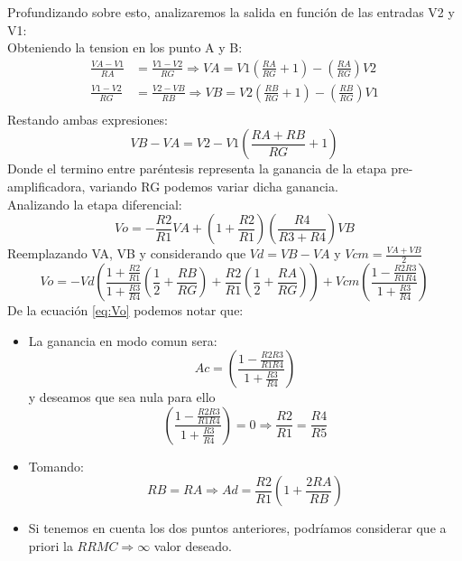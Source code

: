 Profundizando sobre esto, analizaremos la salida en función de las entradas V2 y V1:
\\Obteniendo la tension en los punto A y B:
\begin{equation*}
    \begin{split}
        \frac{VA-V1}{RA} &= \frac{V1-V2}{RG} \Rightarrow
        VA = V1 \left(\frac{RA}{RG} + 1\right) - \left(\frac{RA}{RG}\right)V2\\
        \frac{V1-V2}{RG} &= \frac{V2-VB}{RB} \Rightarrow
        VB = V2 \left(\frac{RB}{RG} + 1\right) - \left(\frac{RB}{RG}\right)V1\\
    \end{split}
\end{equation*}
Restando ambas expresiones:
\begin{equation*}
    VB-VA = V2 -V1 \left(\frac{RA+RB}{RG} + 1 \right)
\end{equation*}
Donde el termino entre paréntesis representa la ganancia de la etapa pre-amplificadora, variando RG podemos variar dicha ganancia.
\\Analizando la etapa diferencial:
\begin{equation*}
    V o=-\frac{R 2}{R 1} V A+\left(1+\frac{R 2}{R 1}\right)\left(\frac{R 4}{R 3+R 4}\right) V B
\end{equation*}
Reemplazando VA, VB y considerando que $Vd=VB-VA$ y $Vcm=\frac{VA+VB}{2}$
\begin{equation}\label{eq:Vo}
    V o=-V d\left(\frac{1+\frac{R 2}{R 1}}{1+\frac{R 3}{R 4}}\left(\frac{1}{2}+\frac{R B}{R G}\right)+\frac{R 2}{R 1}\left(\frac{1}{2}+\frac{R A}{R G}\right)\right)+V c m\left(\frac{1-\frac{R 2 R 3}{R 1 R 4}}{1+\frac{R 3}{R 4}}\right)
\end{equation}
De la ecuación \autoref{eq:Vo} podemos notar que:
\begin{itemize}
    \item La ganancia en modo comun sera: 
    \begin{equation*}
        Ac = \left(\frac{1-\frac{R 2 R 3}{R 1 R 4}}{1+\frac{R 3}{R 4}}\right)
    \end{equation*}
    y deseamos que sea nula para ello \begin{equation*}
        \left(\frac{1-\frac{R 2 R 3}{R 1 R 4}}{1+\frac{R 3}{R 4}}\right) = 0 \Rightarrow \frac{R2}{R1} = \frac{R4}{R5}
    \end{equation*}
    \item Tomando: \begin{equation*}
        RB = RA \Rightarrow Ad = \frac{R2}{R1}\left(1+\frac{2RA}{RB}\right)
    \end{equation*}
    \item Si tenemos en cuenta los dos puntos anteriores, podríamos considerar que a priori la $RRMC \Rightarrow \infty$ valor deseado.
\end{itemize}